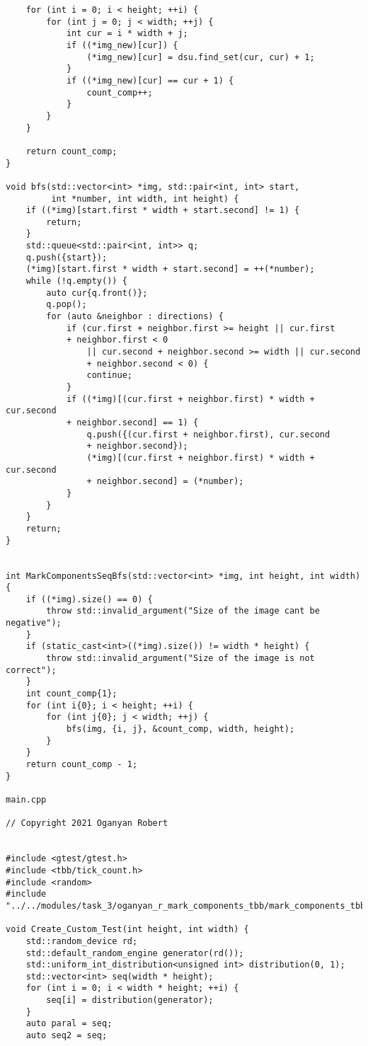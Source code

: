 \documentclass{report}
\begin{document}
\begin{lstlisting}
    for (int i = 0; i < height; ++i) {
        for (int j = 0; j < width; ++j) {
            int cur = i * width + j;
            if ((*img_new)[cur]) {
                (*img_new)[cur] = dsu.find_set(cur, cur) + 1;
            }
            if ((*img_new)[cur] == cur + 1) {
                count_comp++;
            }
        }
    }

    return count_comp;
}

void bfs(std::vector<int> *img, std::pair<int, int> start,
         int *number, int width, int height) {
    if ((*img)[start.first * width + start.second] != 1) {
        return;
    }
    std::queue<std::pair<int, int>> q;
    q.push({start});
    (*img)[start.first * width + start.second] = ++(*number);
    while (!q.empty()) {
        auto cur{q.front()};
        q.pop();
        for (auto &neighbor : directions) {
            if (cur.first + neighbor.first >= height || cur.first
            + neighbor.first < 0
                || cur.second + neighbor.second >= width || cur.second
                + neighbor.second < 0) {
                continue;
            }
            if ((*img)[(cur.first + neighbor.first) * width + cur.second
            + neighbor.second] == 1) {
                q.push({(cur.first + neighbor.first), cur.second
                + neighbor.second});
                (*img)[(cur.first + neighbor.first) * width + cur.second
                + neighbor.second] = (*number);
            }
        }
    }
    return;
}


int MarkComponentsSeqBfs(std::vector<int> *img, int height, int width) {
    if ((*img).size() == 0) {
        throw std::invalid_argument("Size of the image cant be negative");
    }
    if (static_cast<int>((*img).size()) != width * height) {
        throw std::invalid_argument("Size of the image is not correct");
    }
    int count_comp{1};
    for (int i{0}; i < height; ++i) {
        for (int j{0}; j < width; ++j) {
            bfs(img, {i, j}, &count_comp, width, height);
        }
    }
    return count_comp - 1;
}

main.cpp

// Copyright 2021 Oganyan Robert


#include <gtest/gtest.h>
#include <tbb/tick_count.h>
#include <random>
#include "../../modules/task_3/oganyan_r_mark_components_tbb/mark_components_tbb.h"

void Create_Custom_Test(int height, int width) {
    std::random_device rd;
    std::default_random_engine generator(rd());
    std::uniform_int_distribution<unsigned int> distribution(0, 1);
    std::vector<int> seq(width * height);
    for (int i = 0; i < width * height; ++i) {
        seq[i] = distribution(generator);
    }
    auto paral = seq;
    auto seq2 = seq;


\end{lstlisting}
\end{document}
